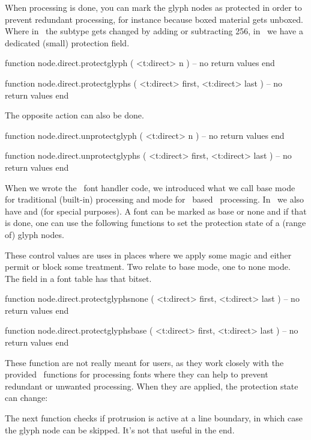 When processing is done, you can mark the glyph nodes as protected in order to
prevent redundant processing, for instance because boxed material gets unboxed.
Where in \LUATEX\ the subtype gets changed by adding or subtracting 256, in
\LUAMETATEX\ we have a dedicated (small) protection field.

\starttyping[option=LUA]
function node.direct.protectglyph ( <t:direct> n )
    -- no return values
end

function node.direct.protectglyphs ( <t:direct> first, <t:direct> last )
    -- no return values
end
\stoptyping

The opposite action can also be done.

\starttyping[option=LUA]
function node.direct.unprotectglyph ( <t:direct> n )
    -- no return values
end

function node.direct.unprotectglyphs ( <t:direct> first, <t:direct> last )
    -- no return values
end
\stoptyping

When we wrote the \LUA\ font handler code, we introduced what we call \quote
{base} mode for traditional (built-in) processing and  mode for
\LUA\ based \OPENTYPE\ processing. In \CONTEXT\ we also have  and
 (for special purposes). A font can be marked as base or none and if
that is done, one can use the following functions to set the protection state of
a (range of) glyph nodes.


These control values are uses in places where we apply some magic and either
permit or block some treatment. Two relate to base mode, one to none mode. The
 field in a font table has that bitset.

\starttyping[option=LUA]
function node.direct.protectglyphsnone ( <t:direct> first, <t:direct> last )
    -- no return values
end

function node.direct.protectglyphsbase ( <t:direct> first, <t:direct> last )
    -- no return values
end
\stoptyping

These function are not really meant for users, as they work closely with the
provided \LUA\ functions for processing fonts where they can help to prevent
redundant or unwanted processing. When they are applied, the protection state
can change:


The next function checks if protrusion is active at a line boundary, in which case the glyph
node can be skipped. It's not that useful in the end.

